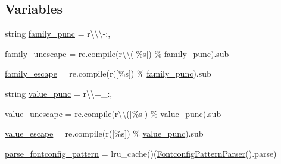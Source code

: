 \subsection*{Variables}
\begin{DoxyCompactItemize}
\item 
string \hyperlink{namespacematplotlib_1_1fontconfig__pattern_a7f5efae0e380b70ce181d1ac16fc11c3}{family\+\_\+punc} = r\textquotesingle{}\textbackslash{}\textbackslash{}\textbackslash{}-\/\+:,\textquotesingle{}
\item 
\hyperlink{namespacematplotlib_1_1fontconfig__pattern_acda67bca6512386531c4088fba81946d}{family\+\_\+unescape} = re.\+compile(r\textquotesingle{}\textbackslash{}\textbackslash{}(\mbox{[}\%s\mbox{]})\textquotesingle{} \% \hyperlink{namespacematplotlib_1_1fontconfig__pattern_a7f5efae0e380b70ce181d1ac16fc11c3}{family\+\_\+punc}).sub
\item 
\hyperlink{namespacematplotlib_1_1fontconfig__pattern_a32b2f305eb822794bd2b538b6a4b8c88}{family\+\_\+escape} = re.\+compile(r\textquotesingle{}(\mbox{[}\%s\mbox{]})\textquotesingle{} \% \hyperlink{namespacematplotlib_1_1fontconfig__pattern_a7f5efae0e380b70ce181d1ac16fc11c3}{family\+\_\+punc}).sub
\item 
string \hyperlink{namespacematplotlib_1_1fontconfig__pattern_acb250aed669612c4beeffe27db8a2695}{value\+\_\+punc} = r\textquotesingle{}\textbackslash{}\textbackslash{}=\+\_\+\+:,\textquotesingle{}
\item 
\hyperlink{namespacematplotlib_1_1fontconfig__pattern_a300528c498890d20349896d13b41ca21}{value\+\_\+unescape} = re.\+compile(r\textquotesingle{}\textbackslash{}\textbackslash{}(\mbox{[}\%s\mbox{]})\textquotesingle{} \% \hyperlink{namespacematplotlib_1_1fontconfig__pattern_acb250aed669612c4beeffe27db8a2695}{value\+\_\+punc}).sub
\item 
\hyperlink{namespacematplotlib_1_1fontconfig__pattern_a70dd2600dcde40804ff2edc53f5d8157}{value\+\_\+escape} = re.\+compile(r\textquotesingle{}(\mbox{[}\%s\mbox{]})\textquotesingle{} \% \hyperlink{namespacematplotlib_1_1fontconfig__pattern_acb250aed669612c4beeffe27db8a2695}{value\+\_\+punc}).sub
\item 
\hyperlink{namespacematplotlib_1_1fontconfig__pattern_aa463a2f0658d5bd0d98bfca74c9b2c81}{parse\+\_\+fontconfig\+\_\+pattern} = lru\+\_\+cache()(\hyperlink{classmatplotlib_1_1fontconfig__pattern_1_1FontconfigPatternParser}{Fontconfig\+Pattern\+Parser}().parse)
\end{DoxyCompactItemize}



